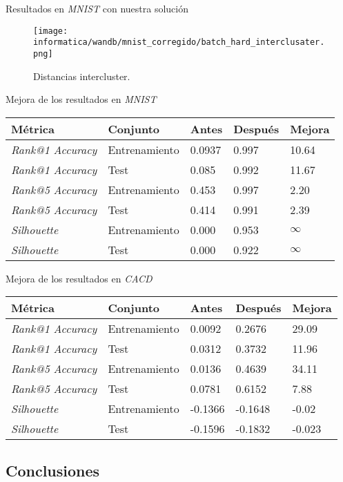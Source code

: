 \begin{frame}{Resultados en \textit{MNIST} con nuestra solución}


	\begin{figure}
		\texttt{[image: informatica/wandb/mnist\_corregido/batch\_hard\_interclusater.png]}
		\caption{Distancias intercluster.}
	\end{figure}


\end{frame}

\begin{frame}{Mejora de los resultados en \textit{MNIST}}


	\begin{table}
		\centering
		\begin{tabular}{|l|l|l|l|l|}
			\hline
			Métrica                  & Conjunto      & Antes  & Después & Mejora   \\
			\hline
			\textit{Rank@1 Accuracy} & Entrenamiento & 0.0937 & 0.997   & 10.64    \\
			\textit{Rank@1 Accuracy} & Test          & 0.085  & 0.992   & 11.67    \\
			\textit{Rank@5 Accuracy} & Entrenamiento & 0.453  & 0.997   & 2.20     \\
			\textit{Rank@5 Accuracy} & Test          & 0.414  & 0.991   & 2.39     \\
			\textit{Silhouette}      & Entrenamiento & 0.000  & 0.953   & $\infty$ \\
			\textit{Silhouette}      & Test          & 0.000  & 0.922   & $\infty$ \\
			\hline
		\end{tabular}
		\label{table:comparaciones_mnist_resultados}
	\end{table}
\end{frame}

\begin{frame}{Mejora de los resultados en \textit{CACD}}

	\begin{table}
		\centering
		\begin{tabular}{|l|l|l|l|l|}
			\hline
			Métrica                  & Conjunto      & Antes   & Después & Mejora \\
			\hline
			\textit{Rank@1 Accuracy} & Entrenamiento & 0.0092  & 0.2676  & 29.09  \\
			\textit{Rank@1 Accuracy} & Test          & 0.0312  & 0.3732  & 11.96  \\
			\textit{Rank@5 Accuracy} & Entrenamiento & 0.0136  & 0.4639  & 34.11  \\
			\textit{Rank@5 Accuracy} & Test          & 0.0781  & 0.6152  & 7.88   \\
			\textit{Silhouette}      & Entrenamiento & -0.1366 & -0.1648 & -0.02  \\
			\textit{Silhouette}      & Test          & -0.1596 & -0.1832 & -0.023 \\
			\hline
		\end{tabular}
		\label{table:comparaciones_cacd_resultados}
	\end{table}


\end{frame}

\subsection{Conclusiones}
\begin{frame}

\end{frame}
